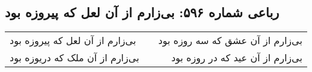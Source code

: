 \begin{center}
\section*{رباعی شماره ۵۹۶: بی‌زارم از آن لعل که پیروزه بود}
\label{sec:0596}
\begin{longtable}{l p{0.5cm} r}
بی‌زارم از آن لعل که پیروزه بود
&&
بی‌زارم از آن عشق که سه روزه بود
\\
بی‌زارم از آن ملک که دریوزه بود
&&
بی‌زارم از آن عید که در روزه بود
\\
\end{longtable}
\end{center}
